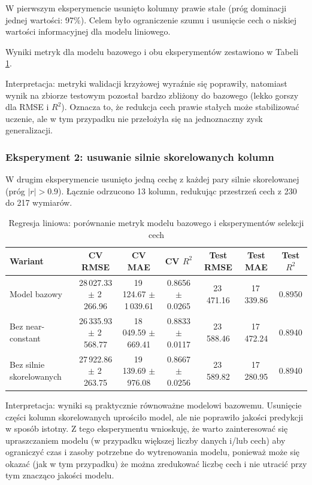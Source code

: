 \documentclass[12pt, a4paper]{article}
\begin{document}
W pierwszym eksperymencie usunięto kolumny prawie stałe (próg dominacji jednej wartości: 97\%). Celem było ograniczenie szumu i usunięcie cech o niskiej wartości informacyjnej dla modelu liniowego.

Wyniki metryk dla modelu bazowego i obu eksperymentów zestawiono w Tabeli \ref{tab:linear_feature_experiments}.

Interpretacja: metryki walidacji krzyżowej wyraźnie się poprawiły, natomiast wynik na zbiorze testowym pozostał bardzo zbliżony do bazowego (lekko gorszy dla RMSE i $R^2$). Oznacza to, że redukcja cech prawie stałych może stabilizować uczenie, ale w tym przypadku nie przełożyła się na jednoznaczny zysk generalizacji.

\subsubsection{Eksperyment 2: usuwanie silnie skorelowanych kolumn}

W drugim eksperymencie usunięto jedną cechę z każdej pary silnie skorelowanej (próg $|r| > 0.9$). Łącznie odrzucono 13 kolumn, redukując przestrzeń cech z 230 do 217 wymiarów.

\begin{table}[H]
\centering
\caption{Regresja liniowa: porównanie metryk modelu bazowego i eksperymentów selekcji cech}
\label{tab:linear_feature_experiments}
\begin{tabular}{|l|c|c|c|c|c|c|}
\hline
\textbf{Wariant} & \textbf{CV RMSE} & \textbf{CV MAE} & \textbf{CV $R^2$} & \textbf{Test RMSE} & \textbf{Test MAE} & \textbf{Test $R^2$} \\
\hline
Model bazowy & 28\,027.33 $\pm$ 2\,266.96 & 19\,124.67 $\pm$ 1\,039.61 & 0.8656 $\pm$ 0.0265 & 23\,471.16 & 17\,339.86 & 0.8950 \\
Bez near-constant & 26\,335.93 $\pm$ 2\,568.77 & 18\,049.59 $\pm$ 669.41 & 0.8833 $\pm$ 0.0117 & 23\,588.46 & 17\,472.24 & 0.8940 \\
Bez silnie skorelowanych & 27\,922.86 $\pm$ 2\,263.75 & 19\,139.69 $\pm$ 976.08 & 0.8667 $\pm$ 0.0256 & 23\,589.82 & 17\,280.95 & 0.8940 \\
\hline
\end{tabular}
\end{table}

Interpretacja: wyniki są praktycznie równoważne modelowi bazowemu. Usunięcie części kolumn skorelowanych uprościło model, ale nie poprawiło jakości predykcji w sposób istotny. Z tego eksperymentu wnioskuję, że warto zainteresować się upraszczaniem modelu (w przypadku większej liczby danych i/lub cech) aby ograniczyć czas i zasoby potrzebne do wytrenowania modelu, ponieważ może się okazać (jak w tym przypadku) że można zredukować liczbę cech i nie utracić przy tym znacząco jakości modelu.
\end{document}

